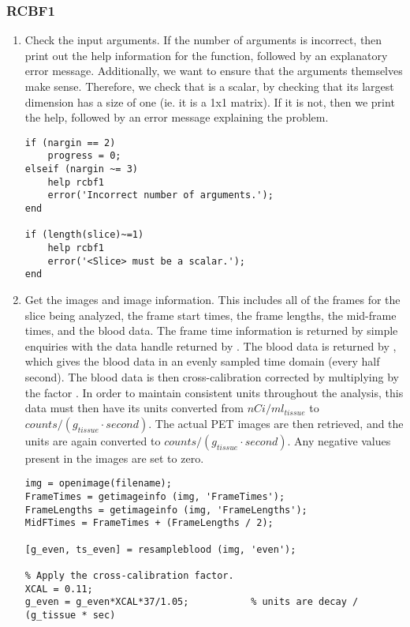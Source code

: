 \subsubsection{RCBF1}

\begin{enumerate}

\item Check the input arguments.  If the number of arguments is
incorrect, then print out the help information for the function,
followed by an explanatory error message.  Additionally, we want to
ensure that the arguments themselves make sense.  Therefore, we check
that  is a scalar, by checking that its largest dimension
has a size of one (ie. it is a 1x1 matrix).  If it is not, then we
print the help, followed by an error message explaining the problem.
\begin{verbatim}
if (nargin == 2)
    progress = 0;
elseif (nargin ~= 3)
    help rcbf1
    error('Incorrect number of arguments.');
end

if (length(slice)~=1)
    help rcbf1
    error('<Slice> must be a scalar.');
end
\end{verbatim}

\item Get the images and image information.  This includes all of the
frames for the slice being analyzed, the frame start times, the frame
lengths, the mid-frame times, and the blood data.  The frame time
information is returned by simple enquiries with the data handle
 returned by .  The blood data is returned
by , which gives the blood data in an evenly
sampled time domain (every half second).  The blood data is then
cross-calibration corrected by multiplying by the factor .
In order to maintain consistent units throughout the analysis, this
data must then have its units converted from $nCi/ml_{tissue}$ to
$counts/(g_{tissue} \cdot second)$.  The actual PET images are then
retrieved, and the units are again converted to $counts/(g_{tissue}
\cdot second)$.  Any negative values present in the images are set to
zero.
\begin{verbatim}
img = openimage(filename);
FrameTimes = getimageinfo (img, 'FrameTimes');
FrameLengths = getimageinfo (img, 'FrameLengths');
MidFTimes = FrameTimes + (FrameLengths / 2);

[g_even, ts_even] = resampleblood (img, 'even');

% Apply the cross-calibration factor.
XCAL = 0.11;
g_even = g_even*XCAL*37/1.05;           % units are decay / (g_tissue * sec)


\end{verbatim}
\end{enumerate}
